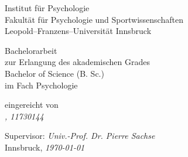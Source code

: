 \begin{titlepage}
   \begin{center}
        Institut für Psychologie\\
        Fakultät für Psychologie und Sportwissenschaften\\
        Leopold--Franzens--Universität Innsbruck
 
        \vspace{4cm}
        \textit{\textbf{\Large {\@title}}}
 
        \vspace{2cm}
        Bachelorarbeit\\
        zur Erlangung des akademischen Grades\\
        Bachelor of Science (B. Sc.)\\
        im Fach Psychologie
 
        \vspace{3cm}
        eingereicht von\\
        \textit{\@author, 11730144}
 
        \vfill
 
        Supervisor: \textit{Univ.-Prof. Dr. Pierre Sachse}\\
        Innsbruck, \textit{\today}
   \end{center}
\end{titlepage}
